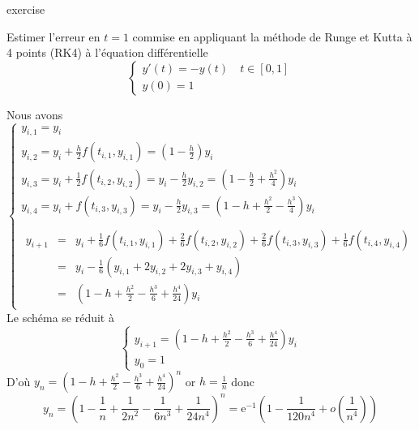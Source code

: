 \documentclass{beamer}
\begin{document}
  \begin{frame}

\begin{block}{exercise}

Estimer l'erreur en $t=1$ commise en appliquant la méthode de Runge et Kutta à 4 points (RK4) à l'équation différentielle 
\[\left\{\begin{array}{l}
y'(t)=-y(t)\quad t\in[0,1]\\
y(0)=1
\end{array} \right.
\]

\end{block}
 \end{frame}

\begin{frame}
Nous avons
\[\left\{\begin{array}{l}

 y_{i,1}=y_{i}\\

 y_{i,2}=y_{i}+\frac h2 f(t_{i,1},y_{i,1})=(1-\frac h2) y_{i}\\

 y_{i,3}=y_{i}+\frac 12 f(t_{i,2},y_{i,2})=y_{i}-\frac h2 y_{i,2}=(1-\frac h2+\frac {h^2}4) y_{i}\\

 y_{i,4}=y_{i}+ f(t_{i,3},y_{i,3})=y_{i}-\frac h2 y_{i,3}=(1-h+\frac {h^2}2-\frac {h^3}4) y_{i}\\

\\
\begin{array}{ccl}
 y_{i+1}&=&y_{i}+\frac 16 f(t_{i,1},y_{i,1})+\frac 26 f(t_{i,2},y_{i,2})+\frac 26 f(t_{i,3},y_{i,3})+\frac 16 f(t_{i,4},y_{i,4})\\
&=&y_{i}-\frac 16\left( y_{i,1}+2y_{i,2}+2y_{i,3}+y_{i,4}\right)\\
&=&\left(1-h+\frac {h^2}2-\frac {h^3}6+\frac {h^4}{24}\right) y_{i}
 \end{array}
\end{array}\right.\]
Le schéma se réduit à
\[\left\{\begin{array}{l}
 y_{i+1}=\left(1-h+\frac {h^2}2-\frac {h^3}6+\frac {h^4}{24}\right) y_{i}\\
y_0=1
\end{array} \right.
\]
D'où $y_n=\left(1-h+\frac {h^2}2-\frac {h^3}6+\frac {h^4}{24}\right)^n$
or $h=\frac 1n$ donc 
\[y_n=\left(1-\frac 1n+\frac 1{2 n^2}-\frac 1{6 n^3}+\frac 1{24 n^4}\right)^n=\mbox{e}^{-1}\left(1-\frac 1{120 n^4}+o(\frac 1{n^4})\right)\]
\end{frame}
\end{document}
